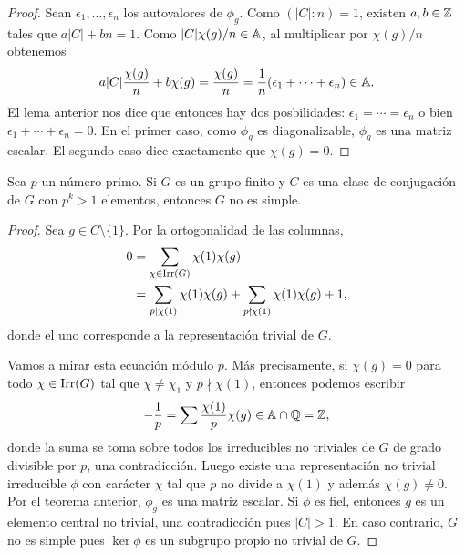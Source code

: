 \begin{proof}
	Sean $\epsilon_1,\dots,\epsilon_n$ los autovalores de $\phi_g$. Como
	$(|C|:n)=1$, existen $a,b\in\mathbb{Z}$ tales que $a|C|+bn=1$.  Como
	$|C|\chi(g)/n\in\mathbb{A}$, al multiplicar por $\chi(g)/n$ obtenemos 
	\[
		a|C|\frac{\chi(g)}{n}+b\chi(g)=\frac{\chi(g)}{n}=\frac{1}{n}(\epsilon_1+\cdots+\epsilon_n)\in\mathbb{A}.
	\]
	El lema anterior nos dice que entonces hay dos posbilidades:
	$\epsilon_1=\cdots=\epsilon_n$ o bien $\epsilon_1+\cdots+\epsilon_n=0$. En
	el primer caso, como $\phi_g$ es diagonalizable, $\phi_g$ es una matriz
	escalar. El segundo caso dice exactamente que $\chi(g)=0$.
\end{proof}

\begin{theorem}[Burnside]
  Sea $p$ un número primo. Si $G$ es un grupo finito y $C$ es una clase de
  conjugación de $G$ con $p^k>1$ elementos, entonces $G$ no es simple.
\end{theorem}

\begin{proof}
	Sea $g\in C\setminus\{1\}$. Por la ortogonalidad de las columnas, 
	\begin{equation}
	\label{eq:Burnside}
	\begin{aligned}
		0&=\sum_{\chi\in\operatorname{Irr}(G)}\chi(1)\chi(g)\\
		&=\sum_{p\mid\chi(1)}\chi(1)\chi(g)+\sum_{p\nmid\chi(1)}\chi(1)\chi(g)+1,
	\end{aligned}
	\end{equation}
	donde el uno corresponde a la representación trivial de $G$. 
	
	Vamos a mirar esta ecuación módulo $p$. Más precisamente, si $\chi(g)=0$ para todo $\chi\in\operatorname{Irr}(G)$
	tal que $\chi\ne\chi_1$ y $p\nmid\chi(1)$, entonces
	podemos escribir
	\[
	-\frac{1}{p}=\sum\frac{\chi(1)}{p}\chi(g)\in\mathbb{A}\cap\mathbb{Q}=\mathbb{Z},
	\]
	donde la suma se toma sobre todos los irreducibles no triviales de $G$ de grado divisible por $p$, 
	una contradicción. Luego existe una representación no
	trivial irreducible $\phi$ con carácter $\chi$ tal que $p$ no divide a
	$\chi(1)$ y además $\chi(g)\ne0$. Por el teorema anterior, $\phi_g$ es una
	matriz escalar. Si $\phi$ es fiel, entonces $g$ es un elemento central no
	trivial, una contradicción pues $|C|>1$. En caso contrario, $G$ no es simple pues
	$\ker\phi$ es un subgrupo propio no trivial de $G$.
\end{proof}

